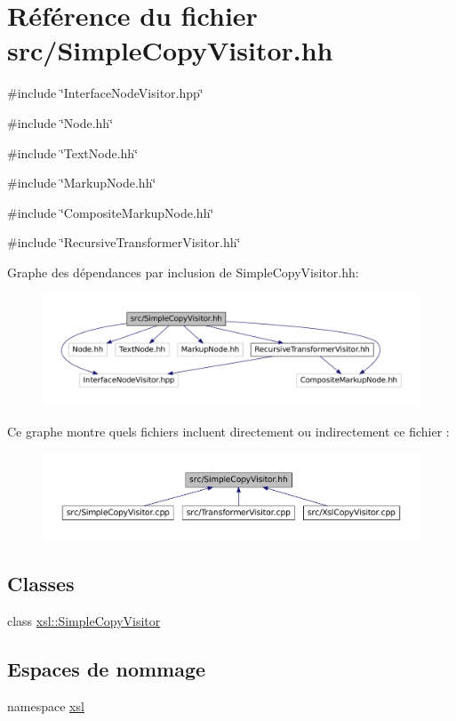 \hypertarget{_simple_copy_visitor_8hh}{
\section{Référence du fichier src/SimpleCopyVisitor.hh}
\label{_simple_copy_visitor_8hh}
}
{\ttfamily \#include \char`\"{}InterfaceNodeVisitor.hpp\char`\"{}}\par
{\ttfamily \#include \char`\"{}Node.hh\char`\"{}}\par
{\ttfamily \#include \char`\"{}TextNode.hh\char`\"{}}\par
{\ttfamily \#include \char`\"{}MarkupNode.hh\char`\"{}}\par
{\ttfamily \#include \char`\"{}CompositeMarkupNode.hh\char`\"{}}\par
{\ttfamily \#include \char`\"{}RecursiveTransformerVisitor.hh\char`\"{}}\par
Graphe des dépendances par inclusion de SimpleCopyVisitor.hh:
\nopagebreak
\begin{figure}[H]
\begin{center}
\leavevmode
\includegraphics[width=400pt]{_simple_copy_visitor_8hh__incl}
\end{center}
\end{figure}
Ce graphe montre quels fichiers incluent directement ou indirectement ce fichier :\nopagebreak
\begin{figure}[H]
\begin{center}
\leavevmode
\includegraphics[width=400pt]{_simple_copy_visitor_8hh__dep__incl}
\end{center}
\end{figure}
\subsection*{Classes}
\begin{DoxyCompactItemize}
\item 
class \hyperlink{classxsl_1_1_simple_copy_visitor}{xsl::SimpleCopyVisitor}
\end{DoxyCompactItemize}
\subsection*{Espaces de nommage}
\begin{DoxyCompactItemize}
\item 
namespace \hyperlink{namespacexsl}{xsl}
\end{DoxyCompactItemize}
